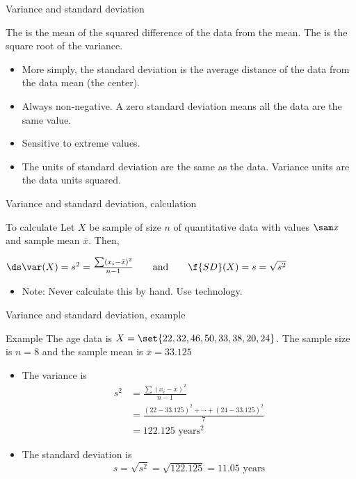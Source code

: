 \documentclass[xcolor=table, handout]{beamer}
\begin{document}
\begin{frame}{Variance and standard deviation}
\begin{block}{}
\large
The  is the mean of the squared difference of the data from the mean. The  is the square root of the variance.
\begin{itemize}
\pause\item More simply, the standard deviation is the average distance of the data from the data mean (the center).
\pause\item Always non-negative. A zero standard deviation means all the data are the same value.
\pause\item Sensitive to extreme values.
\pause\item The units of standard deviation are the same as the data. Variance units are the data units squared.
\end{itemize}
\end{block}
\end{frame}

\begin{frame}{Variance and standard deviation, calculation}
\begin{block}{To calculate}
Let $X$ be sample of size $n$ of quantitative data with values $\sam x$ and sample mean $\bar x$. Then,\\
\smallskip
{\centering
$\ds \var(X) = s^2 = \frac{\sum (x_i - \bar x)^2}{n-1} \qquad \text{and} \qquad  \f{SD}(X) = s = \sqrt{s^2}$
\par}
\begin{itemize}
\pause\item Note: Never calculate this by hand. Use technology.
\end{itemize}
\end{block}
\end{frame}

\begin{frame}{Variance and standard deviation, example}
\begin{exampleblock}{Example}
The age data is $X = \set{22, 32, 46, 50, 33, 38, 20, 24}$. The sample size is $n=8$ and the sample mean is $\bar x = 33.125$
\begin{itemize}
\pause
\item The variance is 
\begin{align*}
s^2 &= \frac{\sum (x_i - \bar x)^2}{n-1}\\
&= \frac{(22-33.125)^2 + \cdots + (24-33.125)^2}{7}\\
&= 122.125 \text{ years}^\text{2}
\end{align*}
\pause
\item The standard deviation is
\[s = \sqrt{s^2} = \sqrt{122.125} = 11.05 \text{ years}\]
\end{itemize}
\smallskip
\end{exampleblock}
\end{frame}
\end{document}
